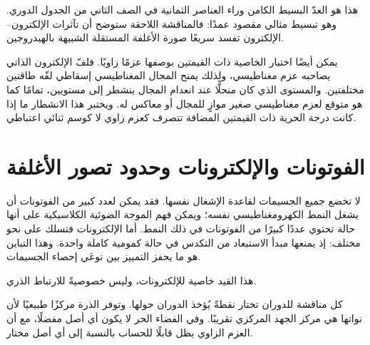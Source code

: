 هذا هو العدّ البسيط الكامن وراء العناصر الثمانية في الصف الثاني من الجدول الدوري. وهو تبسيط مثالي مقصود عمدًا: فالمناقشة اللاحقة ستوضح أن تآثرات الإلكترون--الإلكترون تفسد سريعًا صورة الأغلفة المستقلة الشبيهة بالهيدروجين.

يمكن أيضًا اختبار الخاصية ذات القيمتين بوصفها عزمًا زاويًا. فلفّ الإلكترون الذاتي يصاحبه عزم مغناطيسي، ولذلك يمنح المجال المغناطيسي إسقاطي لفّه طاقتين مختلفتين. والمستوى الذي كان منحلًّا عند انعدام المجال ينشطر إلى مستويين، تمامًا كما هو متوقع لعزم مغناطيسي صغير موازٍ للمجال أو معاكس له. ويختبر هذا الانشطار ما إذا كانت درجة الحرية ذات القيمتين المضافة تتصرف كعزم زاوي لا كوسم ثنائي اعتباطي.

\section{الفوتونات والإلكترونات وحدود تصور الأغلفة}

لا تخضع جميع الجسيمات لقاعدة الإشغال نفسها. فقد يمكن لعدد كبير من الفوتونات أن يشغل النمط الكهرومغناطيسي نفسه؛ ويمكن فهم الموجة الضوئية الكلاسيكية على أنها حالة تحتوي عددًا كبيرًا من الفوتونات في ذلك النمط. أما الإلكترونات فتسلك على نحو مختلف: إذ يمنعها مبدأ الاستبعاد من التكدس في حالة كمومية كاملة واحدة. وهذا التباين هو ما يحفز التمييز بين نوعَي إحصاء الجسيمات.

\begin{classroomqa}
\end{classroomqa}

هذا القيد خاصية للإلكترونات، وليس خصوصيةً للارتباط الذري.

\begin{classroomqa}
\end{classroomqa}

كل مناقشة للدوران تختار نقطةً يُؤخذ الدوران حولها. وتوفر الذرة مركزًا طبيعيًا لأن نواتها هي مركز الجهد المركزي تقريبًا. وفي الفضاء الحر لا يكون أي أصل مفضلًا، مع أن العزم الزاوي يظل قابلًا للحساب بالنسبة إلى أي أصل مختار.


